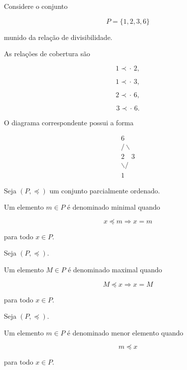 \documentclass[../../main]{subfiles}
\begin{document}
\begin{ex}

	Considere o conjunto

	\[
		P=\{1,2,3,6\}
	\]

	munido da relação de divisibilidade.

	As relações de cobertura são

	\[
		1 \prec\!\!\cdot\, 2,
	\]

	\[
		1 \prec\!\!\cdot\, 3,
	\]

	\[
		2 \prec\!\!\cdot\, 6,
	\]

	\[
		3 \prec\!\!\cdot\, 6.
	\]

	O diagrama correspondente possui a forma

	\[
		\begin{array}{c}
			6            \\[0.3em]
			/ \backslash \\[0.3em]
			2 \quad 3    \\[0.3em]
			\backslash / \\[0.3em]
			1
		\end{array}
	\]

\end{ex}

\begin{defn}
	\label{def:matematica:relacoes:diagramas-de-hasse:elemento-minimal}

	Seja \((P,\preceq)\) um conjunto parcialmente ordenado.

	Um elemento \(m\in P\) é denominado minimal quando

	\[
		x \preceq m
		\Rightarrow
		x=m
	\]

	para todo \(x\in P\).

\end{defn}

\begin{defn}
	\label{def:matematica:relacoes:diagramas-de-hasse:elemento-maximal}

	Seja \((P,\preceq)\).

	Um elemento \(M\in P\) é denominado maximal quando

	\[
		M \preceq x
		\Rightarrow
		x=M
	\]

	para todo \(x\in P\).

\end{defn}

\begin{defn}
	\label{def:matematica:relacoes:diagramas-de-hasse:menor-elemento}

	Seja \((P,\preceq)\).

	Um elemento \(m\in P\) é denominado menor elemento quando

	\[
		m \preceq x
	\]

	para todo \(x\in P\).

\end{defn}
\end{document}
